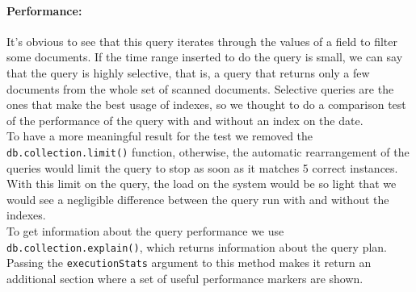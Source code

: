 \begin{enumerate}
    \paragraph{Performance:}
    It's obvious to see that this query iterates through the values of a field to filter some documents.
    If the time range inserted to do the query is small, we can say that the query is highly selective, that is, a query that returns only a few documents from the whole set of scanned documents.
    Selective queries are the ones that make the best usage of indexes, so we thought to do a comparison test of the performance of the query with and without an index on the date.\\
    To have a more meaningful result for the test we removed the \verb|db.collection.limit()| function, otherwise, the automatic rearrangement of the queries would limit the query to stop as soon as it matches 5 correct instances.
    With this limit on the query, the load on the system would be so light that we would see a negligible difference between the query run with and without the indexes.\\
    To get information about the query performance we use \verb|db.collection.explain()|, which returns information about the query plan.
    Passing the \verb|executionStats| argument to this method makes it return an additional section where a set of useful performance markers are shown.


\end{enumerate}
